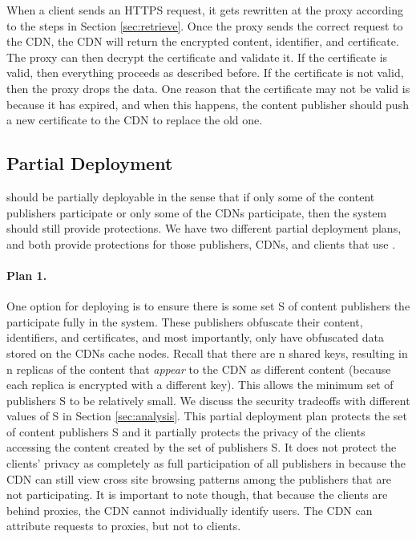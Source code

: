 When a client sends an HTTPS request, it gets rewritten at the proxy according to the steps in Section \ref{sec:retrieve}.  Once the proxy sends the 
correct request to the CDN, the CDN will return the encrypted content, identifier, and certificate.  The proxy can then decrypt 
the certificate and validate it.  If the certificate is valid, then everything proceeds as described before.  If the certificate is 
not valid, then the proxy drops the data.  One reason that the certificate may not be valid is because it has expired, and when 
this happens, the content publisher should push a new certificate to the CDN to replace the old one.

\subsection{Partial Deployment}
\label{sec:partial}
\system{} should be partially deployable in the sense that if only some of the content publishers participate or only some of the CDNs participate, then 
the system should still provide protections.  We have two different partial deployment plans, and both provide protections for those 
publishers, CDNs, and clients that use \system{}. 

\paragraph{Plan 1.}
One option for deploying \system{} is to ensure there is some set S of content publishers the participate fully in the 
system.  These publishers obfuscate their content, identifiers, and certificates, and most importantly, only have 
obfuscated data stored on the CDNs cache nodes.  Recall that there are n shared keys, resulting in n replicas of the 
content that {\it appear} to the CDN as different content (because each replica is encrypted with a different key).  This 
allows the minimum set of publishers S to be relatively small.  We discuss the security tradeoffs with different 
values of S in Section \ref{sec:analysis}.  This partial deployment plan protects the set of content publishers S and it 
partially protects the privacy of the clients accessing the content created by the set of publishers S.  It does not 
protect the clients' privacy as completely as full participation of all publishers in \system{} because the CDN can 
still view cross site browsing patterns among the publishers that are not participating. It is important to note though, that 
because the clients are behind proxies, the CDN cannot individually identify users.  The CDN can attribute requests to proxies, but 
not to clients.  

